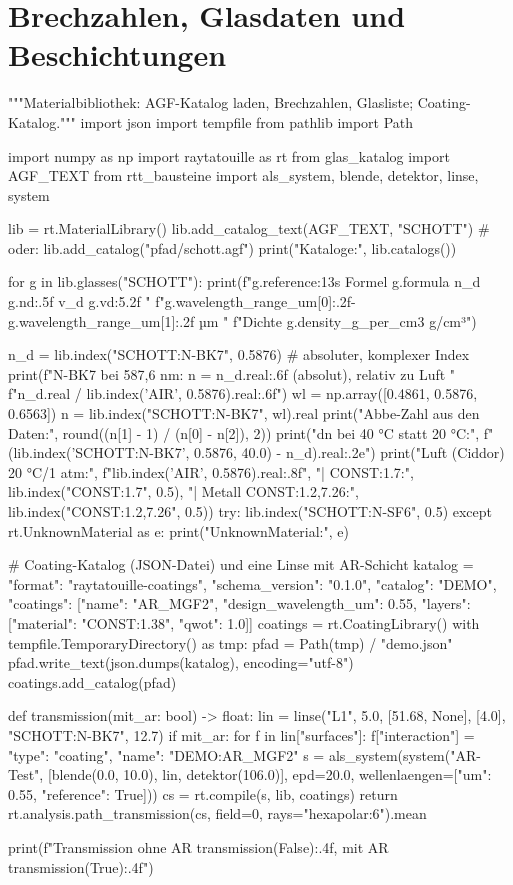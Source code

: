 \documentclass[11pt,a4paper,openany]{book}
\DeclareRobustCommand{\code}[1]{\texttt{\directlua{rttcode("\luaescapestring{\detokenize{#1}}")}}}
\begin{document}
\section{Brechzahlen, Glasdaten und Beschichtungen}
\label{sec:index}

\begin{pycode}[title={\code{ex06_materialien.py}}]
"""Materialbibliothek: AGF-Katalog laden, Brechzahlen, Glasliste; Coating-Katalog."""
import json
import tempfile
from pathlib import Path

import numpy as np
import raytatouille as rt
from glas_katalog import AGF_TEXT
from rtt_bausteine import als_system, blende, detektor, linse, system

lib = rt.MaterialLibrary()
lib.add_catalog_text(AGF_TEXT, "SCHOTT")         # oder: lib.add_catalog("pfad/schott.agf")
print("Kataloge:", lib.catalogs())

for g in lib.glasses("SCHOTT"):
    print(f"{g.reference:13s} Formel {g.formula}  n_d {g.nd:.5f}  v_d {g.vd:5.2f}  "
          f"{g.wavelength_range_um[0]:.2f}-{g.wavelength_range_um[1]:.2f} µm  "
          f"Dichte {g.density_g_per_cm3} g/cm³")

n_d = lib.index("SCHOTT:N-BK7", 0.5876)          # absoluter, komplexer Index
print(f"N-BK7 bei 587,6 nm: n = {n_d.real:.6f} (absolut), relativ zu Luft "
      f"{n_d.real / lib.index('AIR', 0.5876).real:.6f}")
wl = np.array([0.4861, 0.5876, 0.6563])
n = lib.index("SCHOTT:N-BK7", wl).real
print("Abbe-Zahl aus den Daten:", round((n[1] - 1) / (n[0] - n[2]), 2))
print("dn bei 40 °C statt 20 °C:", f"{(lib.index('SCHOTT:N-BK7', 0.5876, 40.0) - n_d).real:.2e}")
print("Luft (Ciddor) 20 °C/1 atm:", f"{lib.index('AIR', 0.5876).real:.8f}",
      "| CONST:1.7:", lib.index("CONST:1.7", 0.5), "| Metall CONST:1.2,7.26:",
      lib.index("CONST:1.2,7.26", 0.5))
try:
    lib.index("SCHOTT:N-SF6", 0.5)
except rt.UnknownMaterial as e:
    print("UnknownMaterial:", e)

# Coating-Katalog (JSON-Datei) und eine Linse mit AR-Schicht
katalog = {"format": "raytatouille-coatings", "schema_version": "0.1.0", "catalog": "DEMO",
           "coatings": [{"name": "AR_MGF2", "design_wavelength_um": 0.55,
                         "layers": [{"material": "CONST:1.38", "qwot": 1.0}]}]}
coatings = rt.CoatingLibrary()
with tempfile.TemporaryDirectory() as tmp:
    pfad = Path(tmp) / "demo.json"
    pfad.write_text(json.dumps(katalog), encoding="utf-8")
    coatings.add_catalog(pfad)

def transmission(mit_ar: bool) -> float:
    lin = linse("L1", 5.0, [51.68, None], [4.0], "SCHOTT:N-BK7", 12.7)
    if mit_ar:
        for f in lin["surfaces"]:
            f["interaction"] = {"type": "coating", "name": "DEMO:AR_MGF2"}
    s = als_system(system("AR-Test", [blende(0.0, 10.0), lin, detektor(106.0)], epd=20.0,
                          wellenlaengen=[{"um": 0.55, "reference": True}]))
    cs = rt.compile(s, lib, coatings)
    return rt.analysis.path_transmission(cs, field=0, rays="hexapolar:6").mean

print(f"Transmission ohne AR {transmission(False):.4f}, mit AR {transmission(True):.4f}")
\end{pycode}
\end{document}
